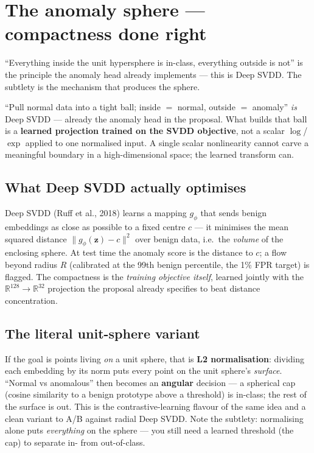 \documentclass[11pt,a4paper]{article}
\begin{document}
\section{The anomaly sphere --- compactness done right}

``Everything inside the unit hypersphere is in-class, everything outside is not'' is the principle the anomaly head already implements --- this is Deep SVDD. The subtlety is the mechanism that produces the sphere.

\begin{tcolorbox}[idea]
``Pull normal data into a tight ball; inside $=$ normal, outside $=$ anomaly'' \emph{is} Deep SVDD --- already the anomaly head in the proposal. What builds that ball is a \textbf{learned projection trained on the SVDD objective}, not a scalar $\log$/$\exp$ applied to one normalised input. A single scalar nonlinearity cannot carve a meaningful boundary in a high-dimensional space; the learned transform can.
\end{tcolorbox}

\subsection{What Deep SVDD actually optimises}
Deep SVDD (Ruff et al., 2018) learns a mapping $g_\phi$ that sends benign embeddings as close as possible to a fixed centre $c$ --- it minimises the mean squared distance $\lVert g_\phi(\mathbf{z}) - c\rVert^2$ over benign data, i.e.\ the \emph{volume} of the enclosing sphere. At test time the anomaly score is the distance to $c$; a flow beyond radius $R$ (calibrated at the 99th benign percentile, the 1\% FPR target) is flagged. The compactness is the \emph{training objective itself}, learned jointly with the $\mathbb{R}^{128}\!\to\!\mathbb{R}^{32}$ projection the proposal already specifies to beat distance concentration.

\subsection{The literal unit-sphere variant}
If the goal is points living \emph{on} a unit sphere, that is \textbf{L2 normalisation}: dividing each embedding by its norm puts every point on the unit sphere's \emph{surface}. ``Normal vs anomalous'' then becomes an \textbf{angular} decision --- a spherical cap (cosine similarity to a benign prototype above a threshold) is in-class; the rest of the surface is out. This is the contrastive-learning flavour of the same idea and a clean variant to A/B against radial Deep SVDD. Note the subtlety: normalising alone puts \emph{everything} on the sphere --- you still need a learned threshold (the cap) to separate in- from out-of-class.
\end{document}
